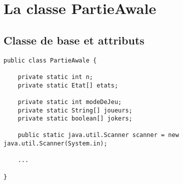 \documentclass[11pt,a4paper]{report}
\begin{document}
\chapter{La classe PartieAwale}
    \section{Classe de base et attributs}
        \begin{lstlisting}
public class PartieAwale {

    private static int n;
    private static Etat[] etats;

    private static int modeDeJeu;
    private static String[] joueurs;
    private static boolean[] jokers;

    public static java.util.Scanner scanner = new java.util.Scanner(System.in);

    ...

}
        \end{lstlisting}

        \newpage
\end{document}
